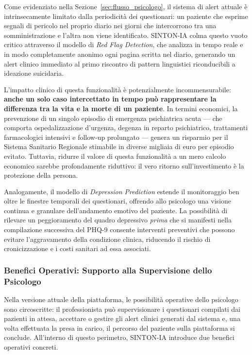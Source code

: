 Come evidenziato nella Sezione~\ref{sec:flusso_psicologo}, il sistema di alert attuale è intrinsecamente limitato dalla periodicità dei questionari: un paziente che esprime segnali di pericolo nel proprio diario nei giorni che intercorrono tra una somministrazione e l'altra non viene identificato. SINTON-IA colma questo vuoto critico attraverso il modello di \textit{Red Flag Detection}, che analizza in tempo reale e in modo completamente anonimo ogni pagina scritta nel diario, generando un alert clinico immediato al primo riscontro di pattern linguistici riconducibili a ideazione suicidaria.

L'impatto clinico di questa funzionalità è potenzialmente incommensurabile: \textbf{anche un solo caso intercettato in tempo può rappresentare la differenza tra la vita e la morte di un paziente}. In termini economici, la prevenzione di un singolo episodio di emergenza psichiatrica acuta --- che comporta ospedalizzazione d'urgenza, degenza in reparto psichiatrico, trattamenti farmacologici intensivi e follow-up prolungato --- genera un risparmio per il Sistema Sanitario Regionale stimabile in diverse migliaia di euro per episodio evitato. Tuttavia, ridurre il valore di questa funzionalità a un mero calcolo economico sarebbe profondamente riduttivo: il vero ritorno sull'investimento è la protezione della persona.

Analogamente, il modello di \textit{Depression Prediction} estende il monitoraggio ben oltre le finestre temporali dei questionari, offrendo allo psicologo una visione continua e granulare dell'andamento emotivo del paziente. La possibilità di rilevare un peggioramento del quadro depressivo \textit{prima} che si manifesti nella compilazione successiva del PHQ-9 consente interventi preventivi che possono evitare l'aggravamento della condizione clinica, riducendo il rischio di cronicizzazione e i costi sanitari ad essa associati.

\subsubsection{Benefici Operativi: Supporto alla Supervisione dello Psicologo}
\label{subsubsec:benefici_operativi}

Nella versione attuale della piattaforma, le possibilità operative dello psicologo sono circoscritte: il professionista può supervisionare i questionari compilati dai pazienti in attesa, accettare o gestire gli alert clinici generati dal sistema e, una volta effettuata la presa in carico, il percorso del paziente sulla piattaforma si conclude. All'interno di questo perimetro, SINTON-IA introduce due benefici operativi concreti.

